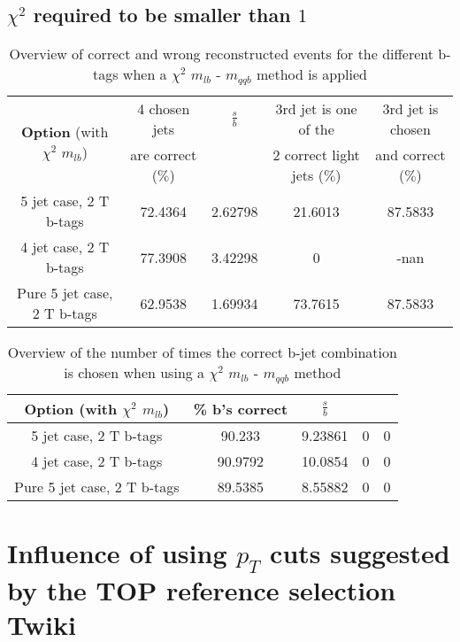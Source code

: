 \subsection{$\chi^{2}$ required to be smaller than $1$}
 \begin{table}[!h] 
 \begin{tabular}{c|c|c|c|c} 
\multirow{2}{*}{\textbf{Option} (with $\chi^{2}$ $m_{lb}$)} & 4 chosen jets & $\frac{s}{b}$ & 3rd jet is one of the & 3rd jet is chosen \\ & are correct ($\%$)    & 	             & 2 correct light jets ($\%$) &  and correct ($\%$)	  \\ \hline 
 5 jet case,      2 T b-tags              & 72.4364 & 2.62798 & 21.6013 & 87.5833 \\ 
 4 jet case,      2 T b-tags              & 77.3908 & 3.42298 & 0 & -nan \\ 
 Pure 5 jet case, 2 T b-tags              & 62.9538 & 1.69934 & 73.7615 & 87.5833 \\ 
 \end{tabular} 
 \caption{Overview of correct and wrong reconstructed events for the different b-tags when a $\chi^{2}$ $m_{lb}$ - $m_{qqb}$ method is applied} 
 \end{table} 
 
 \begin{table}[!h] 
 \begin{tabular}{c|c|c|c|c} 
 \textbf{Option} (with $\chi^{2}$ $m_{lb}$) & \% b's correct   & $\frac{s}{b}$ &  &  \\ \hline 
 5 jet case,      2 T b-tags              & 90.233 & 9.23861 & 0 & 0 \\ 
 4 jet case,      2 T b-tags              & 90.9792 & 10.0854 & 0 & 0 \\ 
 Pure 5 jet case, 2 T b-tags              & 89.5385 & 8.55882 & 0 & 0 \\ 
 \end{tabular} 
 \caption{Overview of the number of times the correct b-jet combination is chosen when using a $\chi^{2}$ $m_{lb}$ - $m_{qqb}$ method} 
 \end{table} 

\section{Influence of using $p_T$ cuts suggested by the TOP reference selection Twiki}

